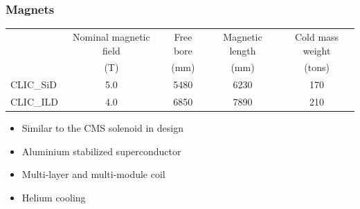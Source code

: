 \documentclass{beamer}
\begin{document}
\begin{frame}
\frametitle{Magnets}
\begin{center}
{\scriptsize
  \begin{tabular}{l c c c c } \toprule
             & Nominal magnetic field & Free bore & Magnetic length & Cold mass weight \\
             & (T)                    & (mm)      & (mm)            & (tons)           \\\midrule
    CLIC\_SiD & 5.0                    & 5480      & 6230            & 170   \\          
    CLIC\_ILD & 4.0                    & 6850      & 7890            & 210             
    \\\bottomrule
  \end{tabular}
  }
  \end{center}
\begin{itemize}
  \item Similar to the CMS solenoid in design
  \item Aluminium stabilized superconductor
  \item Multi-layer and multi-module coil
  \item Helium cooling
\end{itemize}
\end{frame}
\end{document}
